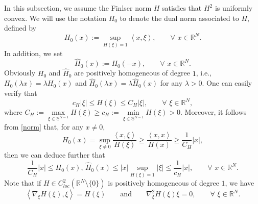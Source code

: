\documentclass[12pt]{amsart}
\theoremstyle{definition}
\theoremstyle{remark}
\theoremstyle{conclusion}
\theoremstyle{conjecture}
\numberwithin{equation}{section}
\begin{document}
In this subsection, we assume the Finlser norm $H$ satisfies that $H^2$ is uniformly convex.
We will use the notation $H_0$ to denote the dual norm associated to $H$, defined by
\begin{equation}\label{def:2.1}
    H_0(x):=\sup\limits_{H(\xi)=1}\left\langle x,\xi\right\rangle, \qquad \forall \,\, x\in\mathbb{R}^N.
\end{equation}
In addition, we set
\begin{equation*}\label{def:2.2}
    \widehat{H}_0(x):=H_0(-x), \qquad \forall \,\, x\in\mathbb{R}^N.
\end{equation*}
Obviously $H_0$ and $\widehat{H}_0$ are positively homogeneous of degree $1$, i.e., $H_0(\lambda x)=\lambda H_0(x)$ and $\widehat{H}_0(\lambda x)=\lambda\widehat{H}_0(x)$ for any $\lambda>0$. One can easily verify that
\begin{equation}\label{norm}
  c_{H}|\xi|\leq H(\xi)\leq C_{H}|\xi|, \qquad \forall \,\, \xi\in\mathbb{R}^{N},
\end{equation}
where $C_{H}:=\max\limits_{\xi\in \mathbb{S}^{N-1}}H(\xi)\geq c_{H}:=\min\limits_{\xi\in \mathbb{S}^{N-1}}H(\xi)>0$. Moreover, it follows from \eqref{norm} that, for any $x\neq0$,
\begin{equation*}
        H_0(x)=\sup\limits_{\xi\neq 0}\frac{\left\langle x,\xi\right\rangle }{H(\xi)}\geq \frac{\left\langle x,x\right\rangle }{H(x)}\geq \frac{1}{C_{H}}|x|,
\end{equation*}
then we can deduce further that
\begin{equation}\label{norm0}
        \frac{1}{C_{H}}|x|\leq H_0(x), \, \widehat{H}_0(x)\leq |x|\sup\limits_{H(\xi)=1}|\xi|\leq \frac{1}{c_{H}}|x|, \qquad \forall \,\, x\in\mathbb{R}^{N}.
\end{equation}
Note that if $H\in C^2_{loc}(\mathbb{R}^N\setminus \{0\})$ is positively homogeneous of degree $1$, we have
\begin{equation}\label{homogeneity}
 \left\langle \nabla_\xi H(\xi),\xi\right\rangle=H(\xi)\qquad\text{and}\qquad\nabla^2_{\xi}H(\xi)\xi=0,\qquad\forall\,\,\xi\in\mathbb{R}^N.
\end{equation}

\medskip
\end{document}
